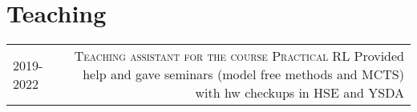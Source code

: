 \section*{\sectionformat Teaching}
\begin{tabular}{@{}L!{\VRule}R}
    2019-2022  {} &
    {\textsc{Teaching assistant for the course Practical RL}} Provided help and gave seminars (model free methods and MCTS) with hw checkups in HSE and YSDA
\end{tabular}
